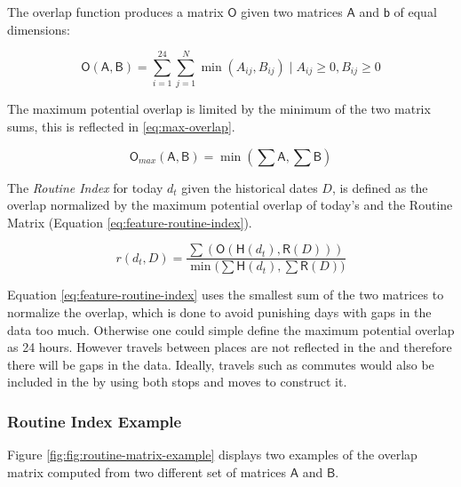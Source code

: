 The overlap function produces a matrix $\mathsf{O}$ given two matrices $\mathsf{A}$ and $\mathsf{b}$ of equal dimensions:

\begin{equation}
\label{eq:overlap-function}
    \mathsf{O}(\mathsf{A}, \mathsf{B}) = \sum_{i=1}^{24} \sum_{j=1}^{N} \min (A_{ij}, B_{ij}) \;|\; A_{ij} \geq 0, B_{ij} \geq 0
\end{equation}

The maximum potential overlap is limited by the minimum of the two matrix sums, this is reflected in \eqref{eq:max-overlap}.

\begin{equation}
\label{eq:max-overlap}
    \mathsf{O}_{max}(\mathsf{A}, \mathsf{B}) = \min (\sum \mathsf{A}, \sum \mathsf{B})
\end{equation}

The \textit{Routine Index} for today $d_t$ given the historical dates $D$, is defined as the overlap normalized by the maximum potential overlap of today's  and the Routine Matrix (Equation \eqref{eq:feature-routine-index}).

\begin{equation}
\label{eq:feature-routine-index}
r(d_t, D) = \frac{\sum (\mathsf{O} (\mathsf{H}(d_t), \mathsf{R}(D)))}{\min \Big(\sum \mathsf{H}(d_t), \sum \mathsf{R}(D) \Big)}
\end{equation}

Equation \eqref{eq:feature-routine-index} uses the smallest sum of the two matrices to normalize the overlap, which is done to avoid punishing days with gaps in the data too much. Otherwise one could simple define the maximum potential overlap as 24 hours. However travels between places are not reflected in the  and therefore there will be gaps in the data. Ideally, travels such as commutes would also be included in the  by using both stops and moves to construct it.

\subsubsection*{Routine Index Example}
Figure \ref{fig:fig:routine-matrix-example} displays two examples of the overlap matrix computed from two different set of matrices $\mathsf{A}$ and $\mathsf{B}$.

